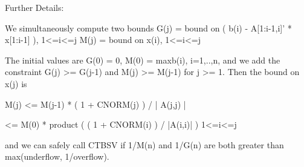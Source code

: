 \begin{DoxyParagraph}{Further Details\+: }
\begin{DoxyVerb}
  We simultaneously compute two bounds
       G(j) = bound on ( b(i) - A[1:i-1,i]' * x[1:i-1] ), 1<=i<=j
       M(j) = bound on x(i), 1<=i<=j

  The initial values are G(0) = 0, M(0) = max{b(i), i=1,..,n}, and we
  add the constraint G(j) >= G(j-1) and M(j) >= M(j-1) for j >= 1.
  Then the bound on x(j) is

       M(j) <= M(j-1) * ( 1 + CNORM(j) ) / | A(j,j) |

            <= M(0) * product ( ( 1 + CNORM(i) ) / |A(i,i)| )
                      1<=i<=j

  and we can safely call CTBSV if 1/M(n) and 1/G(n) are both greater
  than max(underflow, 1/overflow).\end{DoxyVerb}
 
\end{DoxyParagraph}
